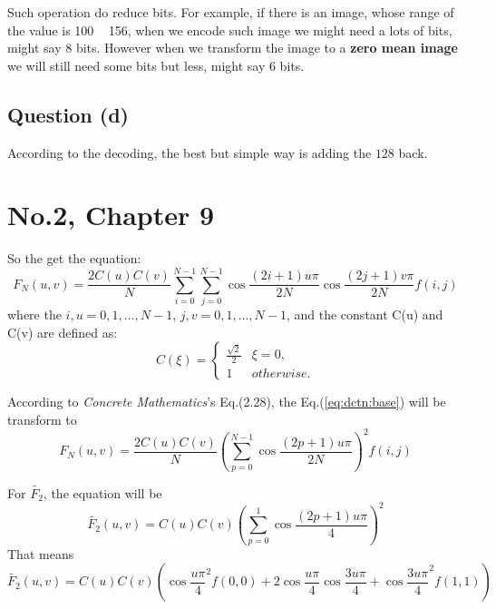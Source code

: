 \documentclass{article}
\def\vConcreteMathematics{\textit{Concrete Mathematics}}
\begin{document}
    Such operation do reduce bits. For example, if there is an image, whose range of
    the value is 100 ~ 156, when we encode such image we might need a lots of bits,
    might say 8 bits. However when we transform the image to a \textbf{zero mean image}
    we will still need some bits but less, might say 6 bits.
    
    \subsection{Question (d)}
    
    According to the decoding, the best but simple way is adding the $128$ back.
    
    \section{No.2, Chapter 9}
    
    So the get the equation:
    \begin{equation}
    \label{eq:dctn:base}
        F_N(u,v) =
            \frac{2C(u)C(v)}{N}
            \sum\limits_{i=0}^{N-1}\sum\limits_{j=0}^{N-1}
            \cos\frac{(2i+1)u\pi}{2N}\cos\frac{(2j+1)v\pi}{2N}
            f(i,j)
    \end{equation} 
    where the $i,u = 0,1,\dots,N-1$, $j,v = 0,1,\dots,N-1$, and the constant C(u) and C(v) are defined as:
    \begin{equation}
        C(\xi) = \left\{
        \begin{array}{cl}
        \frac{\sqrt{2}}{2} & \xi = 0, \\
        1 & otherwise.
        \end{array}
        \right.
    \end{equation}
    
    According to \vConcreteMathematics's Eq.(2.28), the Eq.(\ref{eq:dctn:base}) will
    be transform to
    \begin{equation}
        F_N(u,v)=%
            \frac{2C(u)C(v)}{N}%
            \left(\sum\limits_{p=0}^{N-1}\cos\frac{(2p+1)u\pi}{2N}\right)^2%
            f(i,j)
    \end{equation}
    
    For $\widetilde{F_2}$, the equation will be
    $$
        \widetilde{F_2}(u,v) =
            C(u)C(v)
            \left(\sum\limits_{p=0}^{1}\cos\frac{(2p+1)u\pi}{4}\right)^2%
    $$
    That means
    \begin{equation}
        \label{eq:dctn:tt}
        \widetilde{F_2}(u,v) = 
            C(u)C(v)
            \left(
                \cos\frac{u\pi}{4}^2f(0,0)
              + 2\cos\frac{u\pi}{4}\cos\frac{3u\pi}{4}
              + \cos\frac{3u\pi}{4}^2f(1,1)
            \right)
    \end{equation}
    
\end{document}
